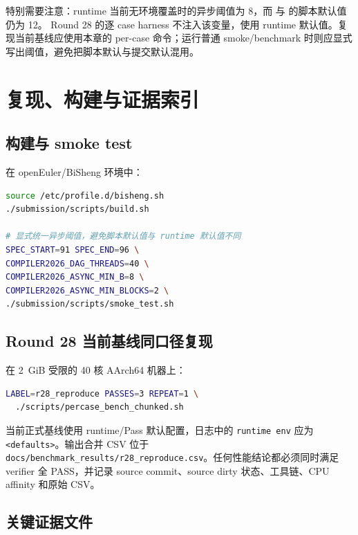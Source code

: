 \documentclass[UTF8,a4paper,openany,11pt,fontset=fandol]{ctexrep}
\begin{document}
\enlargethispage{3\baselineskip}
特别需要注意：runtime 当前无环境覆盖时的异步阈值为 8，而
 与  的脚本默认值仍为 12。
Round 28 的逐 case harness 不注入该变量，使用 runtime 默认值。复现当前基线应使用本章的
per-case 命令；运行普通 smoke/benchmark 时则应显式写出阈值，避免把脚本默认与提交默认混用。

\chapter{复现、构建与证据索引}

\section{构建与 smoke test}

在 openEuler/BiSheng 环境中：

\begin{lstlisting}[language=bash]
source /etc/profile.d/bisheng.sh
./submission/scripts/build.sh

# 显式统一异步阈值，避免脚本默认值与 runtime 默认值不同
SPEC_START=91 SPEC_END=96 \
COMPILER2026_DAG_THREADS=40 \
COMPILER2026_ASYNC_MIN_B=8 \
COMPILER2026_ASYNC_MIN_BLOCKS=2 \
./submission/scripts/smoke_test.sh
\end{lstlisting}

\section{Round 28 当前基线同口径复现}

在 2~GiB 受限的 40 核 AArch64 机器上：

\begin{lstlisting}[language=bash]
LABEL=r28_reproduce PASSES=3 REPEAT=1 \
  ./scripts/percase_bench_chunked.sh
\end{lstlisting}

当前正式基线使用 runtime/Pass 默认配置，日志中的 \texttt{runtime env} 应为
\texttt{<defaults>}。输出合并 CSV 位于
\texttt{docs/benchmark\_results/r28\_reproduce.csv}。任何性能结论都必须同时满足 verifier
全 PASS，并记录 source commit、source dirty 状态、工具链、CPU affinity 和原始 CSV。

\section{关键证据文件}
\end{document}
